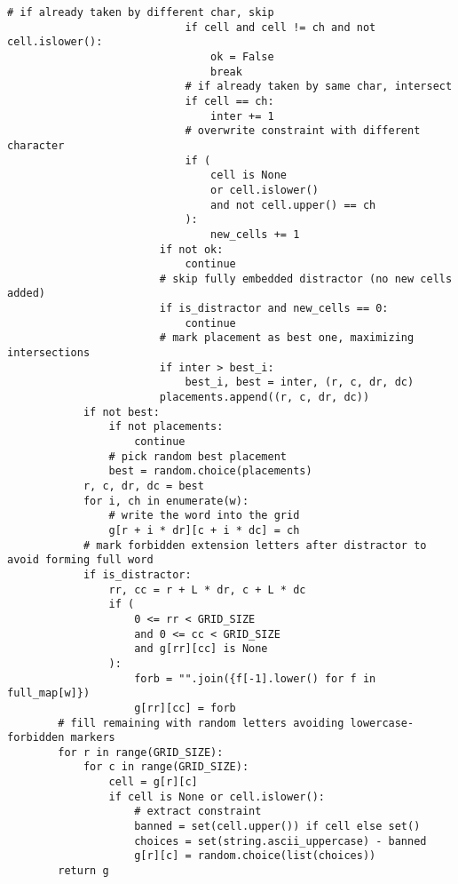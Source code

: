 \documentclass{solutionclass} %
\begin{document}
\begin{solution}
{\begin{lstlisting}[style=pythonstyle]
                            # if already taken by different char, skip
                            if cell and cell != ch and not cell.islower():
                                ok = False
                                break
                            # if already taken by same char, intersect
                            if cell == ch:
                                inter += 1
                            # overwrite constraint with different character
                            if (
                                cell is None
                                or cell.islower()
                                and not cell.upper() == ch
                            ):
                                new_cells += 1
                        if not ok:
                            continue
                        # skip fully embedded distractor (no new cells added)
                        if is_distractor and new_cells == 0:
                            continue
                        # mark placement as best one, maximizing intersections
                        if inter > best_i:
                            best_i, best = inter, (r, c, dr, dc)
                        placements.append((r, c, dr, dc))
            if not best:
                if not placements:
                    continue
                # pick random best placement
                best = random.choice(placements)
            r, c, dr, dc = best
            for i, ch in enumerate(w):
                # write the word into the grid
                g[r + i * dr][c + i * dc] = ch
            # mark forbidden extension letters after distractor to avoid forming full word
            if is_distractor:
                rr, cc = r + L * dr, c + L * dc
                if (
                    0 <= rr < GRID_SIZE
                    and 0 <= cc < GRID_SIZE
                    and g[rr][cc] is None
                ):
                    forb = "".join({f[-1].lower() for f in full_map[w]})
                    g[rr][cc] = forb
        # fill remaining with random letters avoiding lowercase-forbidden markers
        for r in range(GRID_SIZE):
            for c in range(GRID_SIZE):
                cell = g[r][c]
                if cell is None or cell.islower():
                    # extract constraint
                    banned = set(cell.upper()) if cell else set()
                    choices = set(string.ascii_uppercase) - banned
                    g[r][c] = random.choice(list(choices))
        return g
    \end{lstlisting}
        }
    \end{solution}
\end{document}
